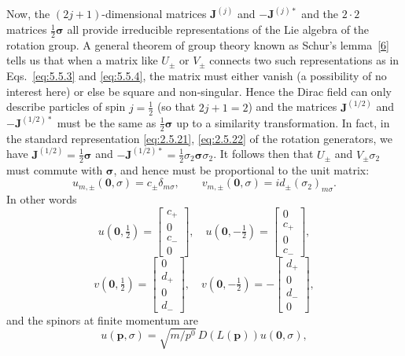 Now, the $(2j+1)$-dimensional matrices $\mathbf J^{(j)}$ and
$-\mathbf J^{(j)*}$ and the $2\cdot2$ matrices
$\frac12\boldsymbol{\sigma}$ all provide irreducible representations of the
Lie algebra of the rotation group. A general theorem of group theory known as
Schur's lemma~\hyperref[ref:5.6]{[6]} tells us that when a matrix like $U_\pm$ or $V_\pm$ connects
two such representations as in Eqs.~\eqref{eq:5.5.3} and \eqref{eq:5.5.4}, the matrix must
either vanish (a possibility of no interest here) or else be square and
non-singular. Hence the Dirac field can only describe particles of spin
$j=\frac12$ (so that $2j+1=2$) and the matrices $\mathbf J^{(1/2)}$ and
$-\mathbf J^{(1/2)*}$ must be the same as
$\frac12\boldsymbol{\sigma}$ up to a similarity transformation. In fact, in
the standard representation \eqref{eq:2.5.21}, \eqref{eq:2.5.22} of the rotation generators, we
have $\mathbf J^{(1/2)}=\frac12\boldsymbol{\sigma}$ and
$-\mathbf J^{(1/2)*}=\frac12\sigma_2\boldsymbol{\sigma}\sigma_2$. It follows
then that $U_\pm$ and $V_\pm\sigma_2$ must commute with
$\boldsymbol{\sigma}$, and hence must be proportional to the unit matrix:
\begin{equation}
u_{m,\pm}(\mathbf0,\sigma)=c_\pm\delta_{m\sigma},
\qquad
v_{m,\pm}(\mathbf0,\sigma)=i d_\pm(\sigma_2)_{m\sigma}.
\tag{5.5.5}\label{eq:5.5.5}
\end{equation}
In other words
\[
u(\mathbf0,\tfrac12)=\begin{bmatrix}c_+\\0\\c_-\\0\end{bmatrix},
\quad
u(\mathbf0,-\tfrac12)=\begin{bmatrix}0\\c_+\\0\\c_-\end{bmatrix},
\]
\[
v(\mathbf0,\tfrac12)=\begin{bmatrix}0\\d_+\\0\\d_-\end{bmatrix},
\quad
v(\mathbf0,-\tfrac12)=-\begin{bmatrix}d_+\\0\\d_-\\0\end{bmatrix},
\]
and the spinors at finite momentum are
\begin{equation}
u(\mathbf p,\sigma)=\sqrt{m/p^0}\,D(L(\mathbf p))u(\mathbf0,\sigma),
\tag{5.5.6}\label{eq:5.5.6}
\end{equation}
